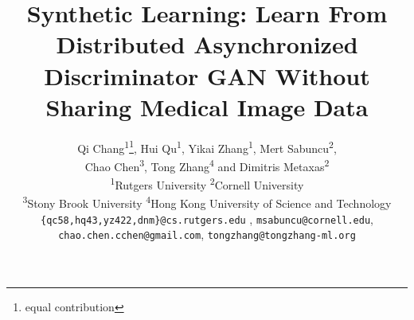 \documentclass[10pt,twocolumn,letterpaper]{article}
\theoremstyle{definition}
\newcommand*{\affaddr}[1]{#1} %
\newcommand*{\affmark}[1][*]{\textsuperscript{#1}}
\newcommand*{\email}[1]{\texttt{#1}}
\begin{document}
\title{Synthetic Learning: Learn From Distributed Asynchronized Discriminator GAN Without Sharing Medical Image Data}

\author{%
Qi Chang\affmark[1]\thanks{equal contribution}, Hui Qu\affmark[1]\footnotemark[1], Yikai Zhang\affmark[1]\footnotemark[1], Mert Sabuncu\affmark[2], \\Chao Chen\affmark[3], Tong Zhang\affmark[4] and Dimitris Metaxas\affmark[2]\\
\affaddr{\affmark[1]Rutgers University}
\affaddr{\affmark[2]Cornell University}\\
\affaddr{\affmark[3]Stony Brook University}
\affaddr{\affmark[4]Hong Kong University of Science and Technology}\\
\email{\{qc58,hq43,yz422,dnm\}@cs.rutgers.edu} , \email{msabuncu@cornell.edu},\\ \email{chao.chen.cchen@gmail.com}, \email{tongzhang@tongzhang-ml.org}%
}


\maketitle
\end{document}
